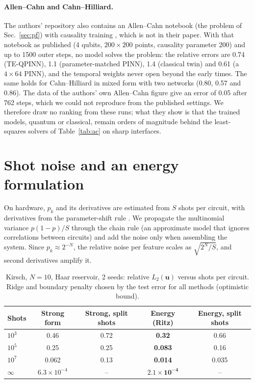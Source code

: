 \documentclass[11pt]{article}
\theoremstyle{remark}\newtheorem*{remark}{Remark}
\begin{document}
\paragraph{Allen--Cahn and Cahn--Hilliard.} The authors' repository also contains an Allen--Cahn notebook (the problem of
Sec.~\ref{sec:pf}) with causality training \citep{wang2024causality}, which is not in their paper. With that notebook
as published (4 qubits, $200\times200$ points, causality parameter 200) and up to 1500 outer steps, no model solves the
problem: the relative errors are 0.74 (TE-QPINN), 1.1 (parameter-matched PINN), 1.4 (classical twin) and 0.61 (a
$4\times64$ PINN), and the temporal weights never open beyond the early times. The same holds for Cahn--Hilliard in
mixed form with two networks (0.80, 0.57 and 0.86). The data of the authors' own Allen--Cahn figure give an error of
0.05 after 762 steps, which we could not reproduce from the published settings.
We therefore draw no ranking from these runs; what they show is that the trained models, quantum or classical, remain
orders of magnitude behind the least-squares solvers of Table~\ref{tab:ac} on sharp interfaces.

\section{Shot noise and an energy formulation}\label{sec:shots}
On hardware, $p_k$ and its derivatives are estimated from $S$ shots per circuit, with derivatives from the
parameter-shift rule \citep{mitarai2018qcl,schuld2019gradients}.
We propagate the multinomial variance $p(1-p)/S$ through the chain rule (an approximate model that ignores
correlations between circuits) and add the noise only when assembling the system.
Since $p_k\approx 2^{-N}$, the relative noise per feature scales as $\sqrt{2^N/S}$, and second derivatives amplify it.

\begin{table}[t]
  \centering
  \caption{Kirsch, $N=10$, Haar reservoir, 2 seeds: relative $L_2(\bm u)$ versus shots per circuit.
           Ridge and boundary penalty chosen by the test error for all methods (optimistic bound).}
  \label{tab:shots}
  \begin{tabular}{lcccc}
    \toprule
    Shots & Strong form & Strong, split shots & Energy (Ritz) & Energy, split shots \\
    \midrule
    $10^3$ & 0.46 & 0.72 & \textbf{0.32} & 0.66 \\
    $10^5$ & 0.25 & 0.25 & \textbf{0.083} & 0.16 \\
    $10^7$ & 0.062 & 0.13 & \textbf{0.014} & 0.035 \\
    $\infty$ & $6.3\times10^{-4}$ & -- & $\bm{2.1\times10^{-4}}$ & -- \\
    \bottomrule
  \end{tabular}
\end{table}
\end{document}
